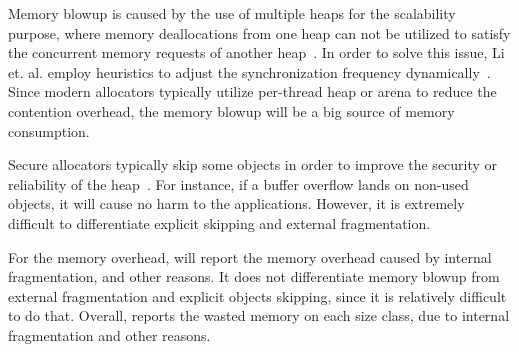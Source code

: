 Memory blowup is caused by the use of multiple heaps for the scalability purpose, where memory deallocations from one heap can not be utilized to satisfy the concurrent memory requests of another heap~\cite{Hoard}. In order to solve this issue, Li et. al. employ heuristics to adjust the synchronization frequency dynamically~\cite{DBLP:conf/iwmm/LiLD19}. Since modern allocators typically utilize per-thread heap or arena to reduce the contention overhead, the memory blowup will be a big source of memory consumption. 

Secure allocators typically skip some objects in order to improve the security or reliability of the heap~\cite{DieHarder, openbsd, Guarder}. For instance, if a buffer overflow lands on non-used objects, it will cause no harm to the applications. However, it is extremely difficult to differentiate explicit skipping and external fragmentation. 

For the memory overhead, \MP{} will report the memory overhead caused by internal fragmentation, and other reasons. It does not differentiate memory blowup from external fragmentation and explicit objects skipping, since it is relatively difficult to do that. Overall, \MP{} reports the wasted memory on each size class, due to internal fragmentation and other reasons. 





